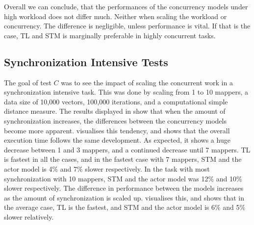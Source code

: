 %
Overall we can conclude, that the performances of the concurrency models under high workload does not differ much. Neither when scaling the workload or concurrency. The difference is negligible, unless performance is vital. If that is the case, \ac{TL} and \ac{STM} is marginally preferable in highly concurrent tasks.%
%
\FloatBarrier
\subsection{Synchronization Intensive Tests}
%
The goal of test $C$ was to see the impact of scaling the concurrent work in a synchronization intensive task. This was done by scaling from 1 to 10 mappers, a data size of 10,000 vectors, 100,000 iterations, and a computational simple distance measure. The results displayed in  show that when the amount of synchronization increases, the differences between the concurrency models become more apparent.  visualises this tendency, and shows that the overall execution time follows the same development. As expected, it shows a huge decrease between 1 and 3 mappers, and a continued decrease until 7 mappers. \ac{TL} is fastest in all the cases, and in the fastest case with 7 mappers, \ac{STM} and the actor model is 4\% and 7\% slower respectively. In the task with most synchronization with 10 mappers, \ac{STM} and the actor model was 12\% and 10\% slower respectively. The difference in performance between the models increases as the amount of synchronization is scaled up.  visualises this, and shows that in the average case, \ac{TL} is the fastest, and \ac{STM} and the actor model is 6\% and 5\% slower relatively.
%
